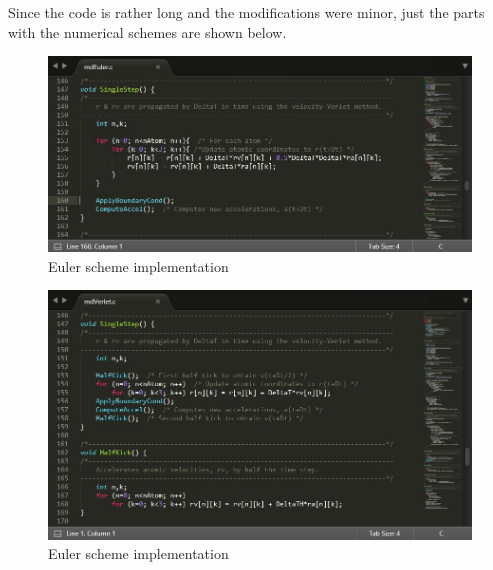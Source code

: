 \documentclass[11pt, oneside]{article}   	%
\begin{document}
Since the code is rather long and the modifications were minor, just the parts with the numerical schemes are shown below.
	\begin{figure}[!htbp]
	\centering
	\includegraphics[scale=0.8]{EulerScheme.jpg}
	\caption{Euler scheme implementation}
	\end{figure}
	
	\begin{figure}[!htbp]
	\centering
	\includegraphics[scale=0.8]{VelVerletScheme.jpg}
	\caption{Euler scheme implementation}
	\end{figure}
\end{document}
